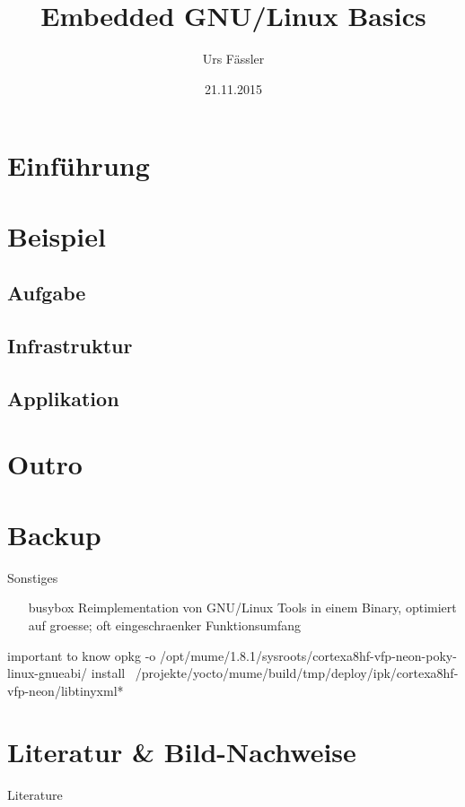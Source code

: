 \documentclass
[
  12pt,
  handout,
  notes=show,
  svgnames		%
]{beamer}
\title{Embedded GNU/Linux Basics}
\author{Urs Fässler}
\date{21.11.2015}
\institute
{
  17. LinuxDay\\
  Dornbirn
}
\begin{document}
\frame{\titlepage}

\section{Einführung}

\section{Beispiel}
\subsection{Aufgabe}

\subsection{Infrastruktur}

\subsection{Applikation}

\section{Outro}


{
\appendix

\section{Backup}



\begin{frame}{Sonstiges}
	\begin{itemize}
		\item[busybox] Reimplementation von GNU/Linux Tools in einem Binary, optimiert auf groesse; oft eingeschraenker Funktionsumfang
	\end{itemize}
\end{frame}

\begin{frame}{important to know}
opkg -o /opt/mume/1.8.1/sysroots/cortexa8hf-vfp-neon-poky-linux-gnueabi/ install ~/projekte/yocto/mume/build/tmp/deploy/ipk/cortexa8hf-vfp-neon/libtinyxml*
\end{frame}

\section{Literatur \& Bild-Nachweise}
\begin{frame}[allowframebreaks]{Literature}
	
\end{frame}

}
\end{document}
